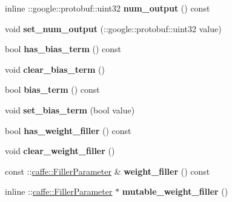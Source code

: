 \begin{DoxyCompactItemize}
inline \+::google\+::protobuf\+::uint32 {\bfseries num\+\_\+output} () const
\item 
\mbox{\label{classcaffe_1_1_inner_product_parameter_ac472289118306addba4399fffa5906f7}} 
void {\bfseries set\+\_\+num\+\_\+output} (\+::google\+::protobuf\+::uint32 value)
\item 
\mbox{\label{classcaffe_1_1_inner_product_parameter_a3c3f6f3a2aa4906f263aa4e79af260e2}} 
bool {\bfseries has\+\_\+bias\+\_\+term} () const
\item 
\mbox{\label{classcaffe_1_1_inner_product_parameter_a40b151672ffa6ab96ad38287b024d8f3}} 
void {\bfseries clear\+\_\+bias\+\_\+term} ()
\item 
\mbox{\label{classcaffe_1_1_inner_product_parameter_acfcfad4c09210825af196e0f8ff9bf8c}} 
bool {\bfseries bias\+\_\+term} () const
\item 
\mbox{\label{classcaffe_1_1_inner_product_parameter_a810d02ecd24b233ffd8df7afdc8f892b}} 
void {\bfseries set\+\_\+bias\+\_\+term} (bool value)
\item 
\mbox{\label{classcaffe_1_1_inner_product_parameter_a9240ff70e346ce17d1f1be1a0ebfd4b0}} 
bool {\bfseries has\+\_\+weight\+\_\+filler} () const
\item 
\mbox{\label{classcaffe_1_1_inner_product_parameter_a3c1e0859395e9b406a203148ab409a6b}} 
void {\bfseries clear\+\_\+weight\+\_\+filler} ()
\item 
\mbox{\label{classcaffe_1_1_inner_product_parameter_ab2b3fe3f6edf94f50f54f2e0f6dc0ebb}} 
const \+::\mbox{\hyperlink{classcaffe_1_1_filler_parameter}{caffe\+::\+Filler\+Parameter}} \& {\bfseries weight\+\_\+filler} () const
\item 
\mbox{\label{classcaffe_1_1_inner_product_parameter_a90dcd021ea89a56616af2e3c86d9ec5a}} 
inline \+::\mbox{\hyperlink{classcaffe_1_1_filler_parameter}{caffe\+::\+Filler\+Parameter}} $\ast$ {\bfseries mutable\+\_\+weight\+\_\+filler} ()

\end{DoxyCompactItemize}
